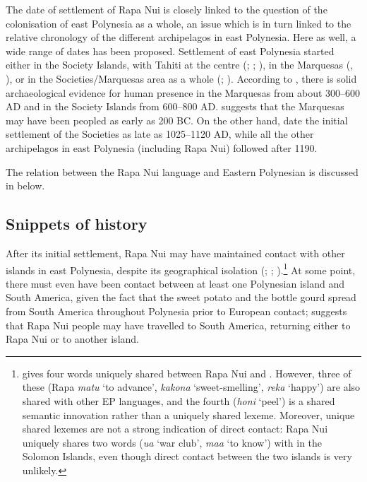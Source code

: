 The date of settlement of Rapa Nui is closely linked to the question of the colonisation of east Polynesia as a whole, an issue which is in turn linked to the relative chronology of the different archipelagos in east Polynesia. Here as well, a wide range of dates has been proposed. Settlement of east Polynesia started either in the Society Islands, with Tahiti at the centre (\citealt{Emory1963}; \citealt{Kirch2000}; \citealt{WilmshurstHunt2011}), in the Marquesas (\citealt[290]{Wilson2012}, \citealt{Green1966}), or in the Societies/Marquesas area as a whole (\citealt[9]{Kirch1986}; \citealt[138]{Marck2000}). According to \citet{SpriggsAnderson1993}, there is solid archaeological evidence for human presence in the Marquesas from about 300–600 AD and in the Society Islands from 600–800 AD. \citet[9]{Kirch1986} suggests that the Marquesas may have been peopled as early as 200 BC. On the other hand, \citet{WilmshurstHunt2011} date the initial settlement of the Societies as late as 1025–1120 AD, while all the other archipelagos in east Polynesia (including Rapa Nui) followed after 1190.

The relation between the Rapa Nui language and Eastern Polynesian is discussed in  below.

\subsection{Snippets of history}\label{sec:1.1.3}

After its initial settlement, Rapa Nui may have maintained contact with other islands in east Polynesia, despite its geographical isolation (\citealt[424]{Clark1983Review}; \citealt{Green1998,Green2000}; \citealt{KirchKahn2007}).\footnote{\label{fn:7}\citet{Walworth2015Classifying} gives four words uniquely shared between Rapa Nui and . However, three of these (Rapa \textit{matu} ‘to advance’, \textit{kakona} ‘sweet-smelling’, \textit{reka} ‘happy’) are also shared with other EP languages, and the fourth (\textit{honi} ‘peel’) is a shared semantic innovation rather than a uniquely shared lexeme. Moreover, unique shared lexemes are not a strong indication of direct contact: Rapa Nui uniquely shares two words (\textit{ua} ‘war club’, \textit{ma{\ꞌ}a} ‘to know’) with  in the Solomon Islands, even though direct contact between the two islands is very unlikely.} At some point, there must even have been contact between at least one Polynesian island and South America, given the fact that the sweet potato and the bottle gourd spread from South America throughout Polynesia prior to European contact; \citet[98]{Green1998} suggests that Rapa Nui people may have travelled to South America, returning either to Rapa Nui or to another island.

